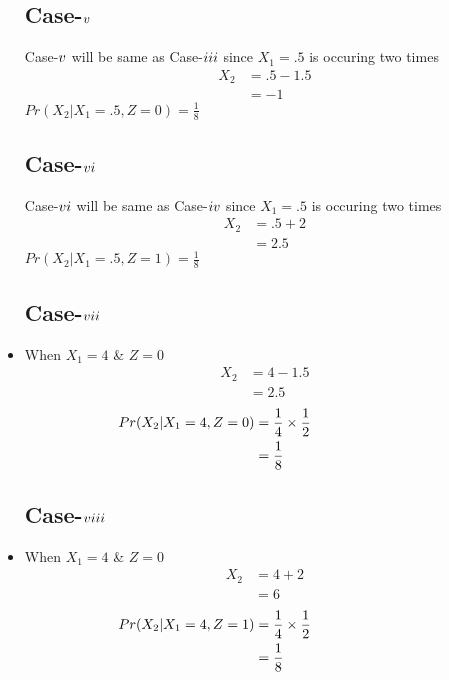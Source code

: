 \documentclass[11pt,a4paper,twocolumn]{article}
\begin{document}
\begin{itemize}
    \subsection{Case-$\romannumeral5$}
    Case-$\romannumeral5$ will be same as Case-$\romannumeral3$ since $X_{1}=.5$ is occuring two times\\
    \begin{align*}
         X_2&=.5-1.5\\
         &=-1
    \end{align*}
    $Pr(X_{2}|X_{1}=.5,Z=0)=\frac{1}{8}$
     \subsection{Case-$\romannumeral6$}
    Case-$\romannumeral6$ will be same as Case-$\romannumeral4$ since $X_{1}=.5$ is occuring two times\\
    \begin{align*}
         X_2&=.5+2\\
         &=2.5
    \end{align*}
    $Pr(X_{2}|X_{1}=.5,Z=1)=\frac{1}{8}$
    \subsection{Case-$\romannumeral7$}
    \item When $X_{1}=4$ \& $Z=0$
    \begin{align*}
        X_{2}&=4-1.5\\
        &=2.5
    \end{align*}
    \begin{align*}
        \hspace{-2.5cm}
        Pr(X_{2}|X_{1}=4,Z=0)&=\frac{1}{4}\times\frac{1}{2}\\
        &=\frac{1}{8}
    \end{align*}
      \subsection{Case-$\romannumeral8$}
    \item When $X_{1}=4$ \& $Z=0$
    \begin{align*}
        X_{2}&=4+2\\
        &=6
    \end{align*}
    \begin{align*}
        \hspace{-2.5cm}
        Pr(X_{2}|X_{1}=4,Z=1)&=\frac{1}{4}\times\frac{1}{2}\\
        &=\frac{1}{8}
    \end{align*}
    \end{itemize}
\end{document}
